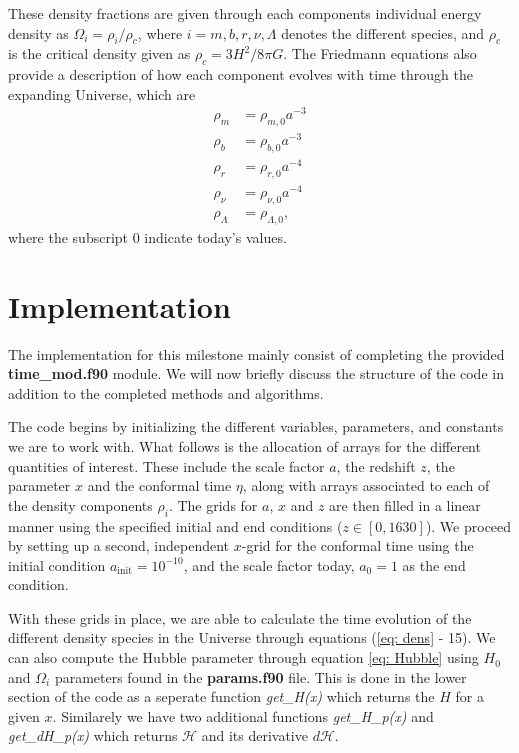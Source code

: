 \documentclass[a4paper, 10pt, reqno]{amsart}
\begin{document}
These density fractions are given through each components individual
energy density as $\Omega_i = \rho_i /\rho_c$, where $i =
m,b,r,\nu,\Lambda$ denotes the different species, and $\rho_c$ is the
critical density given as $\rho_c = 3H^2/8\pi G$. The Friedmann
equations also provide a description of how each component evolves with
time through the expanding Universe, which are
\begin{align}\label{eq: dens}
    \rho_m &= \rho_{m,0} a^{-3}\\ 
    \rho_b &= \rho_{b,0} a^{-3}\\
    \rho_r &= \rho_{r,0} a^{-4}\\
    \rho_\nu &= \rho_{\nu,0} a^{-4}\\
    \rho_\Lambda &= \rho_{\Lambda,0},
\end{align}
where the subscript $0$ indicate today's values.

\section{Implementation}

The implementation for this milestone mainly consist of completing the
provided \textbf{time\_mod.f90} module. We will now briefly discuss the
structure of the code in addition to the completed methods and
algorithms.

The code begins by initializing the different variables, parameters,
and constants we are to work with. What follows is the allocation of
arrays for the different quantities of interest. These include the
scale factor $a$, the redshift $z$, the parameter $x$ and the conformal
time $\eta$, along with arrays associated to each of the density
components $\rho_i$. The grids for $a$, $x$ and $z$ are then filled in
a linear manner using the specified initial and end conditions ($z \in
[0, 1630]$). We proceed by setting up a second, independent $x$-grid
for the conformal time using the initial condition $a_\text{init} =
10^{-10}$, and the scale factor today, $a_0 = 1$ as the end condition.

With these grids in place, we are able to calculate the time evolution
of the different density species in the Universe through equations
(\ref{eq: dens} - 15). We can also compute the Hubble parameter through
equation \eqref{eq: Hubble} using $H_0$ and $\Omega_i$ parameters found
in the \textbf{params.f90} file. This is done in the lower section of
the code as a seperate function \textit{get\_H(x)} which returns the
$H$ for a given $x$. Similarely we have two additional functions
\textit{get\_H\_p(x)} and \textit{get\_dH\_p(x)} which returns
$\mathcal{H}$ and its derivative $d\mathcal{H}$.
\end{document}
